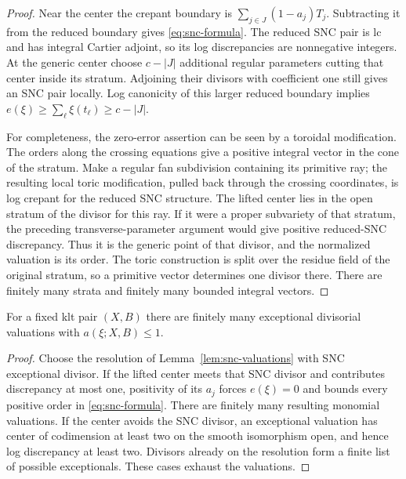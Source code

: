 \begin{proof}
Near the center the crepant boundary is
$\sum_{j\in J}(1-a_j)T_j$. Subtracting it from the reduced boundary gives \eqref{eq:snc-formula}. The reduced SNC pair is lc and has integral Cartier adjoint, so its log discrepancies are nonnegative integers. At the generic center choose $c-|J|$ additional regular parameters cutting that center inside its stratum. Adjoining their divisors with coefficient one still gives an SNC pair locally. Log canonicity of this larger reduced boundary implies
$e(\xi)\geq\sum_\ell\xi(t_\ell)\geq c-|J|$.

For completeness, the zero-error assertion can be seen by a toroidal modification. The orders along the crossing equations give a positive integral vector in the cone of the stratum. Make a regular fan subdivision containing its primitive ray; the resulting local toric modification, pulled back through the crossing coordinates, is log crepant for the reduced SNC structure. The lifted center lies in the open stratum of the divisor for this ray. If it were a proper subvariety of that stratum, the preceding transverse-parameter argument would give positive reduced-SNC discrepancy. Thus it is the generic point of that divisor, and the normalized valuation is its order. The toric construction is split over the residue field of the original stratum, so a primitive vector determines one divisor there. There are finitely many strata and finitely many bounded integral vectors.
\end{proof}

\begin{lemma}\label{lem:small-discrepancies}
For a fixed klt pair $(X,B)$ there are finitely many exceptional divisorial valuations with $a(\xi;X,B)\leq1$.
\end{lemma}

\begin{proof}
Choose the resolution of Lemma~\ref{lem:snc-valuations} with SNC exceptional divisor. If the lifted center meets that SNC divisor and contributes discrepancy at most one, positivity of its $a_j$ forces $e(\xi)=0$ and bounds every positive order in \eqref{eq:snc-formula}. There are finitely many resulting monomial valuations. If the center avoids the SNC divisor, an exceptional valuation has center of codimension at least two on the smooth isomorphism open, and hence log discrepancy at least two. Divisors already on the resolution form a finite list of possible exceptionals. These cases exhaust the valuations.
\end{proof}

